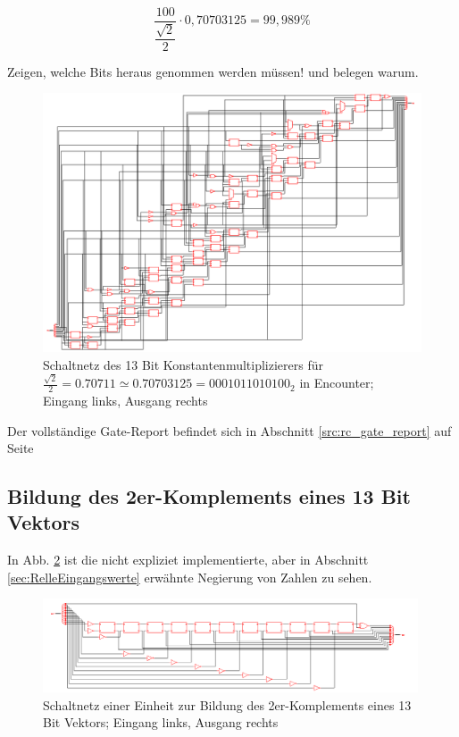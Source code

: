 \begin{equation}\label{eq:abweichungWurzel2halbe}
 \frac{100}{\dfrac{\sqrt{2}}{2}}\cdot 0,70703125 = 99,989\%
\end{equation}

Zeigen, welche Bits heraus genommen werden müssen! und belegen warum.

\begin{figure}[!ht]
\centering  
  \includegraphics[width=1\textwidth]{img/13Bit_Konstantenmultiplizierer_neu.png}
  \caption{Schaltnetz des 13 Bit Konstantenmultiplizierers für $\frac{\sqrt{2}}{2} = 0.70711 \simeq 0.70703125 = 0001011010100_2$ in Encounter; Eingang links, Ausgang rechts}
  \label{pic:Konstantenmultiplizierer}
\end{figure}

Der vollständige Gate-Report befindet sich in Abschnitt \ref{src:rc_gate_report} auf Seite \pageref{src:rc_gate_report}



\subsection{Bildung des 2er-Komplements eines 13 Bit Vektors}


In Abb. \ref{pic:13BitInverter} ist die nicht expliziet implementierte, aber in Abschnitt \ref{sec:RelleEingangswerte} erwähnte Negierung von Zahlen zu sehen.

\begin{figure}[htpb]
\centering
\includegraphics[width=0.99\textwidth]{img/13Bit_Negierer.png}
\caption{Schaltnetz einer Einheit zur Bildung des 2er-Komplements eines 13 Bit Vektors; Eingang links, Ausgang rechts}
\label{pic:13BitInverter}
\end{figure}

